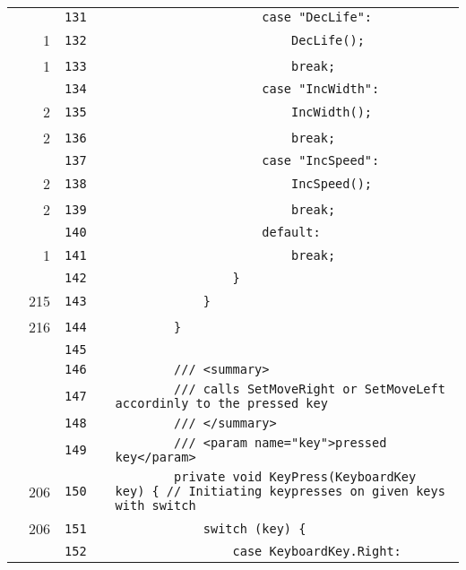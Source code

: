 \documentclass[a4paper,landscape,10pt]{article}
\begin{document}
\begin{longtable}[l]{lrrll}
\cellcolor{gray} &  & \verb~131~ & & \verb~                    case "DecLife":~\\
\cellcolor{green} & 1 & \verb~132~ & & \verb~                        DecLife();~\\
\cellcolor{green} & 1 & \verb~133~ & & \verb~                        break;~\\
\cellcolor{gray} &  & \verb~134~ & & \verb~                    case "IncWidth":~\\
\cellcolor{green} & 2 & \verb~135~ & & \verb~                        IncWidth();~\\
\cellcolor{green} & 2 & \verb~136~ & & \verb~                        break;~\\
\cellcolor{gray} &  & \verb~137~ & & \verb~                    case "IncSpeed":~\\
\cellcolor{green} & 2 & \verb~138~ & & \verb~                        IncSpeed();~\\
\cellcolor{green} & 2 & \verb~139~ & & \verb~                        break;~\\
\cellcolor{gray} &  & \verb~140~ & & \verb~                    default:~\\
\cellcolor{green} & 1 & \verb~141~ & & \verb~                        break;~\\
\cellcolor{gray} &  & \verb~142~ & & \verb~                }~\\
\cellcolor{green} & 215 & \verb~143~ & & \verb~            }~\\
\cellcolor{green} & 216 & \verb~144~ & & \verb~        }~\\
\cellcolor{gray} &  & \verb~145~ & & \verb~~\\
\cellcolor{gray} &  & \verb~146~ & & \verb~        /// <summary>~\\
\cellcolor{gray} &  & \verb~147~ & & \verb~        /// calls SetMoveRight or SetMoveLeft accordinly to the pressed key~\\
\cellcolor{gray} &  & \verb~148~ & & \verb~        /// </summary>~\\
\cellcolor{gray} &  & \verb~149~ & & \verb~        /// <param name="key">pressed key</param>~\\
\cellcolor{green} & 206 & \verb~150~ & & \verb~        private void KeyPress(KeyboardKey key) { // Initiating keypresses on given keys with switch~\\
\cellcolor{green} & 206 & \verb~151~ & & \verb~            switch (key) {~\\
\cellcolor{gray} &  & \verb~152~ & & \verb~                case KeyboardKey.Right:~\\

\end{longtable}
\end{document}
